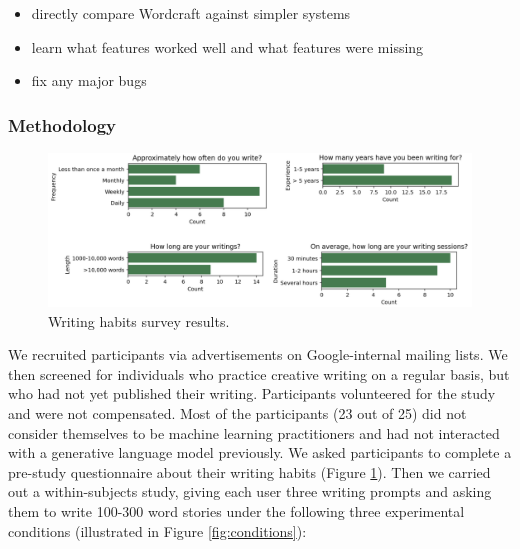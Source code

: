 \begin{itemize}
  \item directly compare Wordcraft against simpler systems
  \item learn what features worked well and what features were missing
  \item fix any major bugs
\end{itemize}

\subsubsection{Methodology} 

\begin{figure}[tbp]
  \centering
  \includegraphics[width=\linewidth]{figures/recruitment_survey.png}
  \caption{Writing habits survey results.}
  \label{fig:writing_habits}
\end{figure}

\noindent We recruited participants via advertisements on Google-internal mailing lists. We then screened for individuals who practice creative writing on a regular basis, but who had not yet published their writing. 
Participants volunteered for the study and were not compensated. 
Most of the participants (23 out of 25) did not consider themselves to be machine learning practitioners and had not interacted with a generative language model previously.
We asked participants to complete a pre-study questionnaire about their writing habits (Figure \ref{fig:writing_habits}).
Then we carried out a within-subjects study, giving each user three writing prompts and asking them to write 100-300 word stories under the following three experimental conditions (illustrated in Figure \ref{fig:conditions}):

